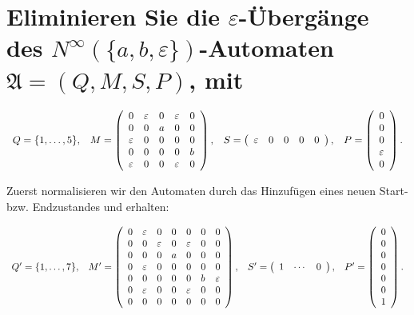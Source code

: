\documentclass[]{scrartcl}
\newcommand{\matr}[2]{\left(\begin{array}{#1}#2\end{array}\right)}
\newcommand{\e}{\varepsilon}
\begin{document}
\setcounter{section}{9}

\section{Eliminieren Sie die $\e$-Übergänge des $N^\infty(\{a,b,\e\})$-Automaten $\mathfrak{A} = (Q,M,S,P)$, mit}

$$
\begin{array}{c c c c}
	Q = \{1,\dots,5\}, &
	M = \matr{l l l l l}{
		0 & \e & 0 & \e & 0\\
		0 & 0 & a & 0 & 0\\
		\e & 0 & 0 & 0 & 0\\
		0 & 0 & 0 & 0 & b\\
		\e & 0 & 0 & \e & 0\\
	}, &
	S = \matr{l l l l l}{\e & 0 & 0 & 0 & 0}, &
	P = \matr{l}{0\\0\\0\\\e\\0}.
\end{array}
$$

Zuerst normalisieren wir den Automaten durch das Hinzufügen eines neuen Start- bzw. Endzustandes und erhalten:

$$
\begin{array}{c c c c}
	Q' = \{1,\dots,7\}, &
	M' = \matr{l l l l l l l}{
		0 & \e & 0 & 0 & 0 & 0 & 0\\
		0 & 0 & \e & 0 & \e & 0 & 0\\
		0 & 0 & 0 & a & 0 & 0 & 0\\
		0 & \e & 0 & 0 & 0 & 0 & 0\\
		0 & 0 & 0 & 0 & 0 & b & \e\\
		0 & \e & 0 & 0 & \e & 0 & 0\\
		0 & 0 & 0 & 0 & 0 & 0 & 0\\
	}, &
	S' = \matr{l l l}{1 & \cdots & 0}, &
	P' = \matr{l}{0\\0\\0\\0\\0\\0\\1}.
\end{array}
$$
\end{document}
